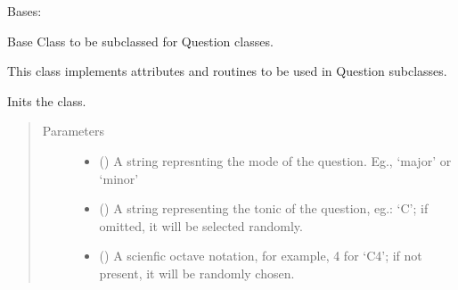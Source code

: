 \documentclass[letterpaper,10pt,english]{sphinxmanual}
\begin{document}
\begin{fulllineitems}
\label{\detokenize{index:birdears.questionbase.QuestionBase}}
Bases: 

Base Class to be subclassed for Question classes.

This class implements attributes and routines to be used in Question
subclasses.

\begin{fulllineitems}
\label{\detokenize{index:birdears.questionbase.QuestionBase.__init__}}
Inits the class.
\begin{quote}\begin{description}
\item[{Parameters}] \leavevmode\begin{itemize}
\item {} 
 () \textendash{} A string represnting the mode of the question.
Eg., ‘major’ or ‘minor’

\item {} 
 () \textendash{} A string representing the tonic of the
question, eg.: ‘C’; if omitted, it will be selected
randomly.

\item {} 
 () \textendash{} A scienfic octave notation, for example,
4 for ‘C4’; if not present, it will be randomly chosen.


\end{itemize}
\end{description}
\end{quote}
\end{fulllineitems}
\end{fulllineitems}
\end{document}
